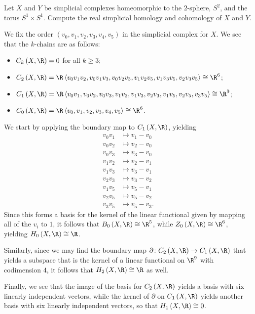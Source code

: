 \documentclass[10pt]{mypackage}
\begin{document}
\RaggedRight
\begin{problem}[Problem 1]
  Let $X$ and $Y$ be simplicial complexes homeomorphic to the $2$-sphere, $S^{2}$, and the torus $S^{1}\times S^{1}$. Compute the real simplicial homology and cohomology of $X$ and $Y$.
\end{problem}
\begin{solution}
  We fix the order $\left( v_0,v_1,v_2,v_3,v_4,v_5 \right)$ in the simplicial complex for $X$. We see that the $k$-chains are as follows:
  \begin{itemize}
    \item $C_k\left( X,\R \right) = 0$ for all $k\geq 3$;
    \item $C_2\left( X,\R \right) = \R\left\langle v_0v_1v_2,v_0v_1v_3,v_0v_2v_3,v_1v_2v_5,v_1v_3v_5,v_2v_3v_5 \right\rangle \cong \R^{6}$;
    \item $C_1\left( X,\R \right) = \R\left\langle v_0v_1,v_0v_2,v_0v_3,v_1v_2,v_1v_3,v_2v_3,v_1v_5,v_2v_5,v_3v_5 \right\rangle\cong \R^{9}$;
    \item $C_0\left( X,\R \right) = \R\left\langle v_0,v_1,v_2,v_3,v_4,v_5 \right\rangle \cong \R^{6}$.
  \end{itemize}
  We start by applying the boundary map to $C_1\left( X,\R \right)$, yielding
  \begin{align*}
    v_0v_1 &\mapsto v_1-v_0\\
    v_0v_2 &\mapsto v_2-v_0\\
    v_0v_3 &\mapsto v_3-v_0\\
    v_1v_2 &\mapsto v_2-v_1\\
    v_1v_3 &\mapsto v_3-v_1\\
    v_2v_3 &\mapsto v_3-v_2\\
    v_1v_5 &\mapsto v_5-v_1\\
    v_2v_5 &\mapsto v_5-v_2\\
    v_3v_5 &\mapsto v_5-v_3.
  \end{align*}
  Since this forms a basis for the kernel of the linear functional given by mapping all of the $v_i$ to $1$, it follows that $B_0\left( X,\R \right)\cong \R^{5}$, while $Z_0\left( X,\R \right)\cong \R^{6}$, yielding $H_0\left( X,\R \right)\cong \R$.\newline

  Similarly, since we may find the boundary map $\partial\colon C_2\left( X,\R \right)\rightarrow C_1\left( X,\R \right)$ that yields a subspace that is the kernel of a linear functional on $\R^9$ with codimension $4$, it follows that $H_2\left( X,\R \right)\cong \R$ as well.\newline

  Finally, we see that the image of the basis for $C_2\left( X,\R \right)$ yields a basis with six linearly independent vectors, while the kernel of $\partial$ on $C_1\left( X,\R \right)$ yields another basis with six linearly independent vectors, so that $H_1\left( X,\R \right) \cong 0$.
\end{solution}
\end{document}
